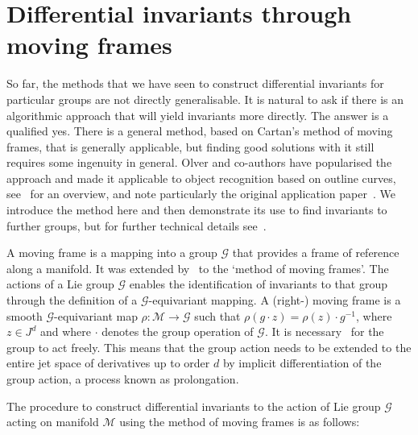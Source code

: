 \documentclass[review,onefignum,onetabnum]{siamonline190516}
\begin{document}
\section{Differential invariants through moving frames}\label{sec:movingframes}

So far, the methods that we have seen to construct differential invariants for particular groups are not directly generalisable. It is natural to ask if there is an algorithmic approach that will yield invariants more directly. The answer is a qualified yes. There is a general method, based on Cartan's method of moving frames, that is generally applicable, but finding good solutions with it still requires some ingenuity in general. Olver and co-authors have popularised the approach and made it applicable to object recognition based on outline curves, see~\citet{Olver2005} for an overview, and note particularly the original application paper~\citep{Calabi1998}.  We introduce the method here and then demonstrate its use to find invariants to further groups, but for further technical details see~\citet{OlverCIT}. 

A moving frame is a mapping into a group $\mathcal{G}$ that provides a frame of reference along a manifold.  It was extended by~\citet{Cartan35} to the `method of moving frames'. The actions of a Lie group $\mathcal{G}$ enables the identification of invariants to that group through the definition of a $\mathcal{G}$-equivariant mapping. A (right-) moving frame is a smooth $\mathcal{G}$-equivariant map $\rho : \mathcal{M} \to \mathcal{G}$ such that $\rho (g \cdot z) = \rho(z) \cdot g^{-1}$, where $z \in J^d$ and where $\cdot$ denotes the group operation of $\mathcal{G}$. It is necessary~\citep{Olver2013} for the group to act freely. This means that the group action needs to be extended to the entire jet space of derivatives up to order $d$ by implicit differentiation of the group action, a process known as prolongation.

The procedure to construct differential invariants to the action of Lie group $\mathcal{G}$ acting on manifold $\mathcal{M}$ using the method of moving frames is as follows:
\end{document}
